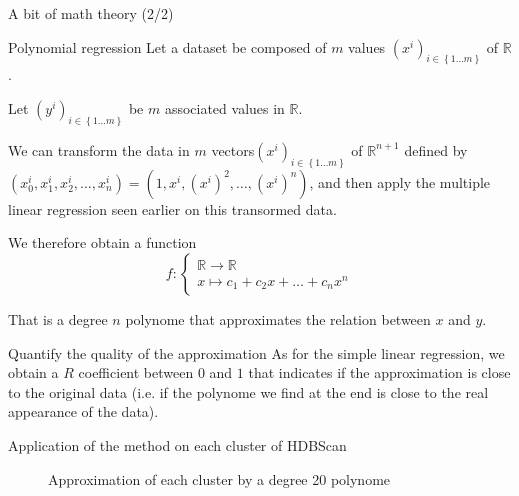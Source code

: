 \begin{frame}{A bit of math theory (2/2)}
    \begin{block}{Polynomial regression}
        Let a dataset be composed of $m$ values $\left(x^{i}\right)_{i\in\left\{ 1\dots m\right\} }$ of $\mathbb{R}$. 

        Let $\ensuremath{\left(y^{i}\right)_{i\in\left\{ 1\dots m\right\}}}$ be $m$ associated values in $\mathbb{R}$.

        We can transform the data in $m$ vectors$\left(x^{i}\right)_{i\in\left\{ 1\dots m\right\}}$
        of $\mathbb{R}^{n+1}$ defined by $(x_{0}^{i},x_{1}^{i},x_{2}^{i},\dots,x_{n}^{i})=(1,x^{i},(x^{i})^{2},\dots,(x^{i})^{n})$, 
        and then apply the multiple linear regression seen earlier on this transormed data.
        
        We therefore obtain a function 
        \[
            f:\begin{cases}
            \mathbb{R}\rightarrow\mathbb{R}\\
            x\mapsto c_{1}+c_{2}x+\dots+c_{n}x^{n}
            \end{cases}
        \]
        
        That is a degree $n$ polynome that approximates the relation between $x$ and $y$.
    \end{block}

    \begin{block}{Quantify the quality of the approximation}
        As for the simple linear regression, we obtain a $R$ coefficient between $0$ and $1$ that indicates if the approximation is close to the original data 
        (i.e. if the polynome we find at the end is close to the real appearance of the data).
    \end{block}
\end{frame}

\begin{frame}{Application of the method on each cluster of HDBScan}
    \begin{figure}
        \caption{Approximation of each cluster by a degree 20 polynome}
    \end{figure}
\end{frame}

